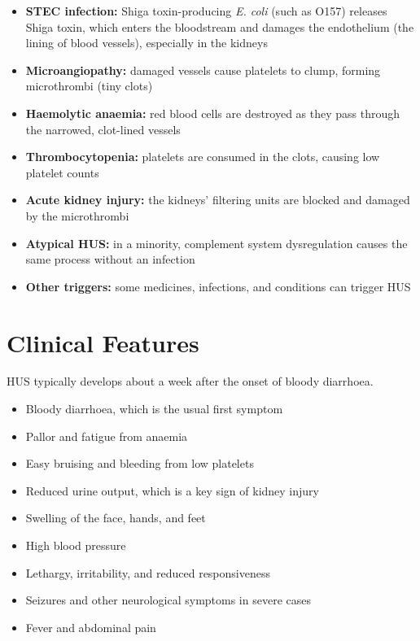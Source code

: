 \begin{itemize}
    \item \textbf{STEC infection:} Shiga toxin-producing \textit{E. coli} (such as O157) releases Shiga toxin, which enters the bloodstream and damages the endothelium (the lining of blood vessels), especially in the kidneys
    \item \textbf{Microangiopathy:} damaged vessels cause platelets to clump, forming microthrombi (tiny clots)
    \item \textbf{Haemolytic anaemia:} red blood cells are destroyed as they pass through the narrowed, clot-lined vessels
    \item \textbf{Thrombocytopenia:} platelets are consumed in the clots, causing low platelet counts
    \item \textbf{Acute kidney injury:} the kidneys' filtering units are blocked and damaged by the microthrombi
    \item \textbf{Atypical HUS:} in a minority, complement system dysregulation causes the same process without an infection
    \item \textbf{Other triggers:} some medicines, infections, and conditions can trigger HUS
\end{itemize}

\section*{Clinical Features}
HUS typically develops about a week after the onset of bloody diarrhoea.

\begin{itemize}
    \item Bloody diarrhoea, which is the usual first symptom
    \item Pallor and fatigue from anaemia
    \item Easy bruising and bleeding from low platelets
    \item Reduced urine output, which is a key sign of kidney injury
    \item Swelling of the face, hands, and feet
    \item High blood pressure
    \item Lethargy, irritability, and reduced responsiveness
    \item Seizures and other neurological symptoms in severe cases
    \item Fever and abdominal pain
\end{itemize}

